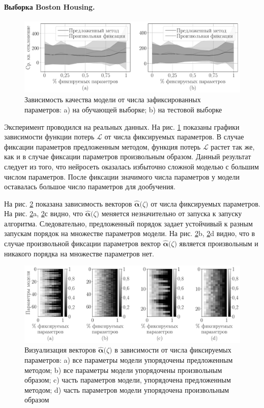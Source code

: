 \paragraph{Выборка Boston Housing.}
\begin{figure}[h!t]\center
\includegraphics[width=1\textwidth]{results/order/boston_data_loss}
\caption{Зависимость качества модели от числа зафиксированных параметров: a) на обучающей выборке; b) на тестовой выборке}
\label{fg:ex:bost:1}
\end{figure}
Эксперимент проводился на реальных данных.
На рис. \ref{fg:ex:bost:1} показаны графики зависимости функции потерь $\mathcal{L}$ от числа фиксируемых параметров. В случае фиксации параметров предложенным методом, функция потерь $\mathcal{L}$ растет так же, как и в случае фиксации параметров произвольным образом.
Данный результат следует из того, что нейросеть оказалась избыточно сложной моделью с большим числом параметров. После фиксации значимого числа параметров у модели оставалась большое число параметров для дообучения.

На рис. \ref{fg:ex:bost:2} показана зависимость векторов $\hat{\bm{\alpha}}\bigr(\zeta\bigr)$ от числа фиксируемых параметров. На рис. \ref{fg:ex:bost:2}a, \ref{fg:ex:bost:2}с видно, что $\hat{\bm{\alpha}}\bigr(\zeta\bigr)$ меняется незначительно от запуска к запуску алгоритма. Следовательно, предложенный порядок задает устойчивый к разным запускам порядок на множестве параметров модели. На рис. \ref{fg:ex:bost:2}b, \ref{fg:ex:bost:2}d видно, что в случае произвольной фиксации параметров вектор $\hat{\bm{\alpha}}\bigr(\zeta\bigr)$ является произвольным и никакого порядка на множестве параметров нет.

\begin{figure}[h!t]\center
\includegraphics[width=1\textwidth]{results/order/boston_data_matshow}
\caption{Визуализация векторов $\hat{\bm{\alpha}}\bigr(\zeta\bigr)$ в зависимости от числа фиксируемых параметров: a) все параметры модели упорядочены предложенным методом; b) все параметры модели упорядочены произвольным образом; c) часть параметров модели, упорядочена предложенным методом; d) часть параметров модели упорядочена произвольным образом}
\label{fg:ex:bost:2}
\end{figure}


